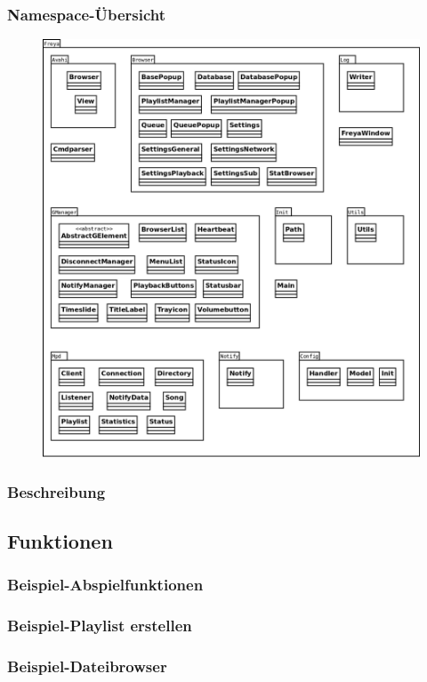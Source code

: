 \subsubsection{Namespace-Übersicht}
\begin{figure}[h]
\centering
\includegraphics[scale=0.3]{Namespace_Uebersicht.png}
\end{figure}
\newpage
\subsubsection{Beschreibung}
\subsection{Funktionen}
\subsubsection{Beispiel-Abspielfunktionen}
\subsubsection{Beispiel-Playlist erstellen}
\subsubsection{Beispiel-Dateibrowser}
